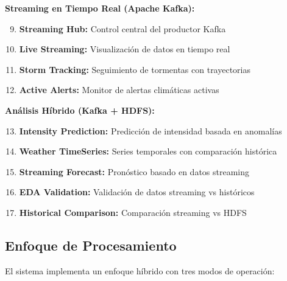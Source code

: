 \documentclass[12pt,a4paper]{scrartcl}
\begin{document}
\textbf{Streaming en Tiempo Real (Apache Kafka):}
\begin{enumerate}
    \setcounter{enumi}{8}
    \item \textbf{Streaming Hub:} Control central del productor Kafka
    \item \textbf{Live Streaming:} Visualización de datos en tiempo real
    \item \textbf{Storm Tracking:} Seguimiento de tormentas con trayectorias
    \item \textbf{Active Alerts:} Monitor de alertas climáticas activas
\end{enumerate}

\textbf{Análisis Híbrido (Kafka + HDFS):}
\begin{enumerate}
    \setcounter{enumi}{12}
    \item \textbf{Intensity Prediction:} Predicción de intensidad basada en anomalías
    \item \textbf{Weather TimeSeries:} Series temporales con comparación histórica
    \item \textbf{Streaming Forecast:} Pronóstico basado en datos streaming
    \item \textbf{EDA Validation:} Validación de datos streaming vs históricos
    \item \textbf{Historical Comparison:} Comparación streaming vs HDFS
\end{enumerate}

\subsection{Enfoque de Procesamiento}

El sistema implementa un enfoque híbrido con tres modos de operación:
\end{document}
